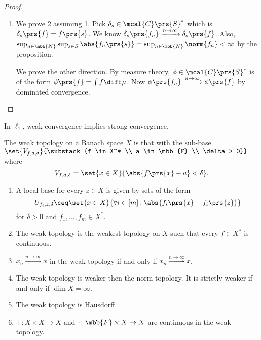 \documentclass[10pt, twoside]{book}
\begin{document}
\begin{proof}
\begin{enumerate}
\item 
We prove 2 assuming 1.
Pick $\delta_s \in \mcal{C}\prs{S}^*$ which is $\delta_s\prs{f} = f\prs{s}$. We know $\delta_s \prs{f_n} \xrightarrow{n\to\infty} \delta_s\prs{f}$. Also, $\sup_{n \in \mbb{N}} \sup_{s \in S} \abs{f_n\prs{s}} = \sup_{n \in \mbb{N}} \norm{f_n} < \infty$ by the proposition.

We prove the other direction. By measure theory, $\phi \in \mcal{C}\prs{S}^*$ is of the form $\phi\prs{f} = \int f \diff \mu$. Now $\phi\prs{f_n} \xrightarrow{n\to\infty} \phi\prs{f}$ by dominated convergence.
\end{enumerate}
\end{proof}

\begin{example}
In $\ell_1$, weak convergence implies strong convergence.
\end{example}

\begin{definition}
The weak topology on a Banach space $X$ is that with the sub-base $\set{V_{f,a,\delta}}{\substack{f \in X^* \\ a \in \mbb{F} \\ \delta > 0}}$ where
\[V_{f,a,\delta} = \set{x \in X}{\abs{f\prs{x} - a} < \delta} \text{.}\]
\end{definition}

\begin{proposition}
\begin{enumerate}
\item A local base for every $z \in X$ is given by sets of the form
\[U_{f_i, z, \delta} \ceq \set{x \in X}{\forall i \in [m] \colon \abs{f_i\prs{x} - f_i\prs{z}}}\]
for $\delta > 0$ and $f_1, \ldots, f_m \in X^*$.
\item The weak topology is the weakest topology on $X$ such that every $f \in X^*$ is continuous.
\item $x_n \xrightarrow{n\to\infty} x$ in the weak topology if and only if $x_n \overset{n\to\infty}{\rightharpoonup} x$.
\item The weak topology is weaker then the norm topology. It is strictly weaker if and only if $\dim X = \infty$.
\item The weak topology is Hausdorff.
\item $+ \colon X \times X \to X$ and $\cdot \colon \mbb{F} \times X \to X$ are continuous in the weak topology.
\end{enumerate}
\end{proposition}
\end{document}
